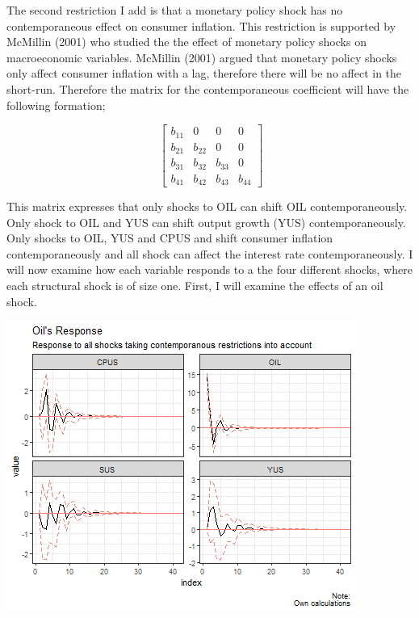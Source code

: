 \documentclass[11pt,preprint, authoryear]{elsarticle}
\let\origfigure\figure
\let\endorigfigure\endfigure
\renewenvironment{figure}[1][2] {
    \expandafter\origfigure\expandafter[H]
} {
    \endorigfigure
}
\numberwithin{equation}{section}
\numberwithin{figure}{section}
\numberwithin{table}{section}
\begin{document}
The second restriction I add is that a monetary policy shock has no
contemporaneous effect on consumer inflation. This restriction is
supported by McMillin (2001) who studied the the effect of monetary
policy shocks on macroeconomic variables. McMillin (2001) argued that
monetary policy shocks only affect consumer inflation with a lag,
therefore there will be no affect in the short-run. Therefore the matrix
for the contemporaneous coefficient will have the following formation;

\[\ \begin{bmatrix} b_{11}& 0 & 0 & 0 \\
b_{21}& b_{22}& 0 & 0 \\
b_{31}& b_{32}& b_{33} & 0 \\
b_{41}& b_{42}& b_{43} & b_{44} \end{bmatrix} \]

This matrix expresses that only shocks to OIL can shift OIL
contemporaneously. Only shock to OIL and YUS can shift output growth
(YUS) contemporaneously. Only shocks to OIL, YUS and CPUS and shift
consumer inflation contemporaneously and all shock can affect the
interest rate contemporaneously. I will now examine how each variable
responds to a the four different shocks, where each structural shock is
of size one. First, I will examine the effects of an oil shock.

\begin{figure}[H]

{\centering \includegraphics{replication_files/figure-latex/Figure2-1} 

}

\caption{Response of Oil Price\label{Figure2}}\label{fig:Figure2}
\end{figure}
\end{document}
